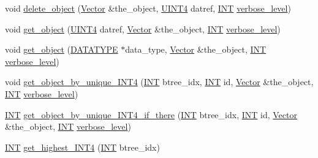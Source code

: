 \begin{DoxyCompactItemize}
\item 
void \mbox{\hyperlink{classdatabase_a69f061ffa820d1926718dafad5f5513c}{delete\+\_\+object}} (\mbox{\hyperlink{class_vector}{Vector}} \&the\+\_\+object, \mbox{\hyperlink{galois_8h_ac94af6544c710549c9fca744fd510395}{U\+I\+N\+T4}} datref, \mbox{\hyperlink{galois_8h_a09fddde158a3a20bd2dcadb609de11dc}{I\+NT}} \mbox{\hyperlink{simeon_8_c_a818073fbcc2f439e7c56952f67386122}{verbose\+\_\+level}})
\item 
void \mbox{\hyperlink{classdatabase_a2f58ec1301addabc2fb6544038e108c6}{get\+\_\+object}} (\mbox{\hyperlink{galois_8h_ac94af6544c710549c9fca744fd510395}{U\+I\+N\+T4}} datref, \mbox{\hyperlink{class_vector}{Vector}} \&the\+\_\+object, \mbox{\hyperlink{galois_8h_a09fddde158a3a20bd2dcadb609de11dc}{I\+NT}} \mbox{\hyperlink{simeon_8_c_a818073fbcc2f439e7c56952f67386122}{verbose\+\_\+level}})
\item 
void \mbox{\hyperlink{classdatabase_af183761e73fedbd560d9545a36060efc}{get\+\_\+object}} (\mbox{\hyperlink{discreta_8h_abf512b6b30146dda9c59049478bf3e99}{D\+A\+T\+A\+T\+Y\+PE}} $\ast$data\+\_\+type, \mbox{\hyperlink{class_vector}{Vector}} \&the\+\_\+object, \mbox{\hyperlink{galois_8h_a09fddde158a3a20bd2dcadb609de11dc}{I\+NT}} \mbox{\hyperlink{simeon_8_c_a818073fbcc2f439e7c56952f67386122}{verbose\+\_\+level}})
\item 
void \mbox{\hyperlink{classdatabase_ab93d6176bca88b2eb9356566a25ef6be}{get\+\_\+object\+\_\+by\+\_\+unique\+\_\+\+I\+N\+T4}} (\mbox{\hyperlink{galois_8h_a09fddde158a3a20bd2dcadb609de11dc}{I\+NT}} btree\+\_\+idx, \mbox{\hyperlink{galois_8h_a09fddde158a3a20bd2dcadb609de11dc}{I\+NT}} id, \mbox{\hyperlink{class_vector}{Vector}} \&the\+\_\+object, \mbox{\hyperlink{galois_8h_a09fddde158a3a20bd2dcadb609de11dc}{I\+NT}} \mbox{\hyperlink{simeon_8_c_a818073fbcc2f439e7c56952f67386122}{verbose\+\_\+level}})
\item 
\mbox{\hyperlink{galois_8h_a09fddde158a3a20bd2dcadb609de11dc}{I\+NT}} \mbox{\hyperlink{classdatabase_a0d275df405adfb8ccfb78423cd722f4b}{get\+\_\+object\+\_\+by\+\_\+unique\+\_\+\+I\+N\+T4\+\_\+if\+\_\+there}} (\mbox{\hyperlink{galois_8h_a09fddde158a3a20bd2dcadb609de11dc}{I\+NT}} btree\+\_\+idx, \mbox{\hyperlink{galois_8h_a09fddde158a3a20bd2dcadb609de11dc}{I\+NT}} id, \mbox{\hyperlink{class_vector}{Vector}} \&the\+\_\+object, \mbox{\hyperlink{galois_8h_a09fddde158a3a20bd2dcadb609de11dc}{I\+NT}} \mbox{\hyperlink{simeon_8_c_a818073fbcc2f439e7c56952f67386122}{verbose\+\_\+level}})
\item 
\mbox{\hyperlink{galois_8h_a09fddde158a3a20bd2dcadb609de11dc}{I\+NT}} \mbox{\hyperlink{classdatabase_ad4d0dbaf8f34ee6aa357f46b5454986d}{get\+\_\+highest\+\_\+\+I\+N\+T4}} (\mbox{\hyperlink{galois_8h_a09fddde158a3a20bd2dcadb609de11dc}{I\+NT}} btree\+\_\+idx)

\end{DoxyCompactItemize}
